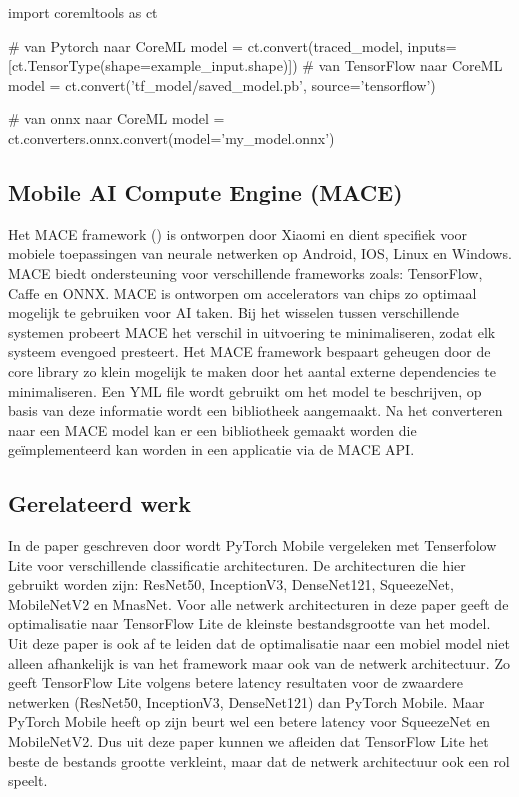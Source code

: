 \begin{python}
import coremltools as ct

# van Pytorch naar CoreML
model = ct.convert(traced_model, inputs=[ct.TensorType(shape=example_input.shape)])
# van TensorFlow naar CoreML
model = ct.convert('tf_model/saved_model.pb', source='tensorflow')

# van onnx naar CoreML
model  = ct.converters.onnx.convert(model='my_model.onnx')
\end{python}

\subsection{Mobile AI Compute Engine (MACE)}
Het MACE framework (\cite{khan_mace_2020}) is ontworpen door Xiaomi en dient specifiek voor mobiele toepassingen van neurale netwerken op Android, IOS, Linux en Windows.
MACE biedt ondersteuning voor verschillende frameworks zoals: TensorFlow, Caffe en ONNX.
MACE is ontworpen om accelerators van chips zo optimaal mogelijk te gebruiken voor AI taken.
Bij het wisselen tussen verschillende systemen probeert MACE het verschil in uitvoering te minimaliseren, zodat elk systeem evengoed presteert.
Het MACE framework bespaart geheugen door de core library zo klein mogelijk te maken door het aantal externe dependencies te minimaliseren.
Een YML file wordt gebruikt om het model te beschrijven, op basis van deze informatie wordt een bibliotheek aangemaakt.
Na het converteren naar een MACE model kan er een bibliotheek gemaakt worden die ge\"implementeerd kan worden in een applicatie via de MACE API.


\subsection{Gerelateerd werk}
In de paper geschreven door \cite{luo_comparison_2020} wordt PyTorch Mobile vergeleken met Tenserfolow Lite voor verschillende classificatie architecturen.
De architecturen die hier gebruikt worden zijn: ResNet50, InceptionV3, DenseNet121, SqueezeNet, MobileNetV2 en MnasNet.
Voor alle netwerk architecturen in deze paper geeft de optimalisatie naar TensorFlow Lite de kleinste bestandsgrootte van het model. 
Uit deze paper is ook af te leiden dat de optimalisatie naar een mobiel model niet alleen afhankelijk is van het framework maar ook van de netwerk architectuur.
Zo geeft TensorFlow Lite volgens \cite{luo_comparison_2020} betere latency resultaten voor de zwaardere netwerken (ResNet50, InceptionV3, DenseNet121) dan PyTorch Mobile.
Maar PyTorch Mobile heeft op zijn beurt wel een betere latency voor SqueezeNet en MobileNetV2.
Dus uit deze paper kunnen we afleiden dat TensorFlow Lite het beste de bestands grootte verkleint, maar dat de netwerk architectuur ook een rol speelt.

